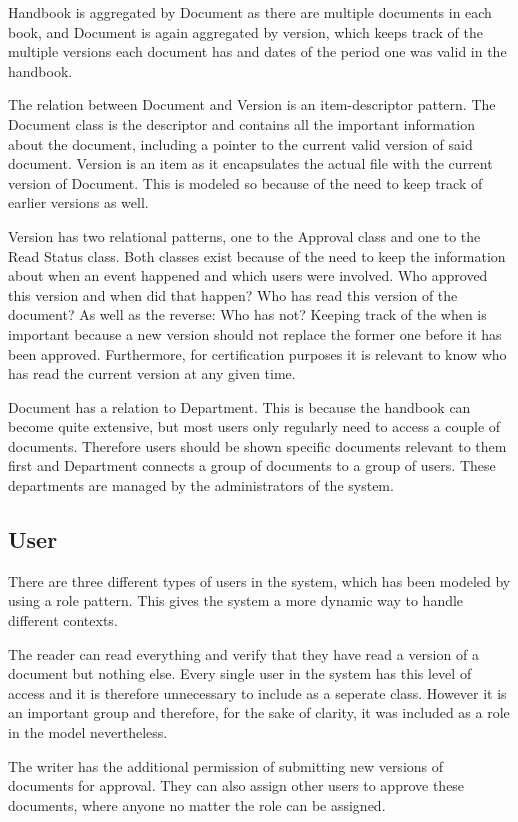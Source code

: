 Handbook is aggregated by Document as there are multiple documents in each book, and Document is again aggregated by version, which keeps track of the multiple versions each document has and dates of the period one was valid in the handbook.

The relation between Document and Version is an item-descriptor pattern.
The Document class is the descriptor and contains all the important information about the document, including a pointer to the current valid version of said document.
Version is an item as it encapsulates the actual file with the current version of Document.
This is modeled so because of the need to keep track of earlier versions as well.

Version has two relational patterns, one to the Approval class and one to the Read Status class.
Both classes exist because of the need to keep the information about when an event happened and which users were involved.
Who approved this version and when did that happen?
Who has read this version of the document?
As well as the reverse: Who has not?
Keeping track of the when is important because a new version should not replace the former one before it has been approved.
Furthermore, for certification purposes it is relevant to know who has read the current version at any given time.

Document has a relation to Department.
This is because the handbook can become quite extensive, but most users only regularly need to access a couple of documents.
Therefore users should be shown specific documents relevant to them first and Department connects a group of documents to a group of users.
These departments are managed by the administrators of the system.

\subsection{User}
There are three different types of users in the system, which has been modeled by using a role pattern. This gives the system a more dynamic way to handle different contexts.

The reader can read everything and verify that they have read a version of a document but nothing else.
Every single user in the system has this level of access and it is therefore unnecessary to include as a seperate class.
However it is an important group and therefore, for the sake of clarity, it was included as a role in the model nevertheless.

The writer has the additional permission of submitting new versions of documents for approval. They can also assign other users to approve these documents, where anyone no matter the role can be assigned.

